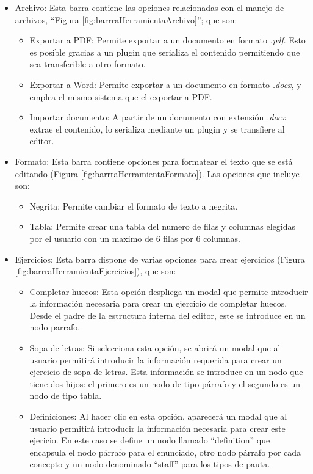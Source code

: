 \begin{itemize}
  \item Archivo: Esta barra contiene las opciones relacionadas con el manejo de archivos, ``Figura \ref{fig:barrraHerramientaArchivo}''; que son:
        \begin{itemize}
          \item  Exportar a PDF: Permite exportar a un documento en formato \textit{.pdf}. Esto es posible gracias a un plugin que serializa el contenido permitiendo que sea transferible a otro formato.
          \item  Exportar a Word: Permite exportar a un documento en formato \textit{.docx}, y emplea el mismo sistema que el exportar a PDF.
          \item Importar documento: A partir de un documento con extensión \textit{.docx} extrae el contenido, lo serializa mediante un plugin y se transfiere al editor.
        \end{itemize}
  \item Formato: Esta barra contiene opciones para formatear el texto que se está editando (Figura \ref{fig:barrraHerramientaFormato}). Las opciones que incluye son:
        \begin{itemize}
          \item Negrita: Permite cambiar el formato de texto a negrita.
          \item Tabla: Permite crear una tabla del numero de filas y columnas elegidas por el usuario con un maximo de 6 filas por 6 columnas.
        \end{itemize}
  \item Ejercicios: Esta barra dispone de varias opciones para crear ejercicios (Figura \ref{fig:barrraHerramientaEjercicios}), que son:
        \begin{itemize}
          \item Completar huecos: Esta opción despliega un modal que permite introducir la información necesaria para crear un ejercicio de completar huecos. Desde el padre de la estructura interna del editor, este se introduce en un nodo parrafo.
          \item Sopa de letras: Si selecciona esta opción, se abrirá un modal que al usuario permitirá introducir la información requerida para crear un ejercicio de sopa de letras. Esta información se introduce en un nodo que tiene dos hijos: el primero es un nodo de tipo párrafo y el segundo es un nodo de tipo tabla.
          \item Definiciones: Al hacer clic en esta opción, aparecerá un modal que al usuario permitirá introducir la información necesaria para crear este ejericio. En este caso se define un nodo llamado ``definition'' que encapsula el nodo párrafo para el enunciado, otro nodo párrafo por cada concepto y un nodo denominado ``staff'' para los tipos de pauta.

\end{itemize}
\end{itemize}
